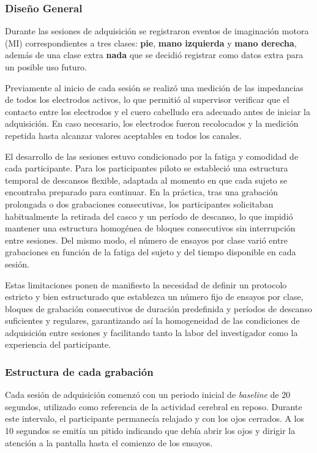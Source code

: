 \subsubsection{Diseño General}
Durante las sesiones de adquisición se registraron eventos de imaginación motora (MI) correspondientes a tres clases: \textbf{pie}, \textbf{mano izquierda} y \textbf{mano derecha}, además de una clase extra \textbf{nada} que se decidió registrar como datos extra para un posible uso futuro.

Previamente al inicio de cada sesión se realizó una medición de las impedancias de todos los electrodos activos, lo que permitió al supervisor verificar que el contacto entre los electrodos y el cuero cabelludo era adecuado antes de iniciar la adquisición. En caso necesario, los electrodos fueron recolocados y la medición repetida hasta alcanzar valores aceptables en todos los canales.

El desarrollo de las sesiones estuvo condicionado por la fatiga y comodidad de cada participante. Para los participantes piloto se estableció una estructura temporal de descansos flexible, adaptada al momento en que cada sujeto se encontraba preparado para continuar. En la práctica, tras una grabación prolongada o dos grabaciones consecutivas, los participantes solicitaban habitualmente la retirada del casco y un período de descanso, lo que impidió mantener una estructura homogénea de bloques consecutivos sin interrupción entre sesiones. Del mismo modo, el número de ensayos por clase varió entre grabaciones en función de la fatiga del sujeto y del tiempo disponible en cada sesión.

Estas limitaciones ponen de manifiesto la necesidad de definir un protocolo estricto y bien estructurado que establezca un número fijo de ensayos por clase, bloques de grabación consecutivos de duración predefinida y períodos de descanso suficientes y regulares, garantizando así la homogeneidad de las condiciones de adquisición entre sesiones y facilitando tanto la labor del investigador como la experiencia del participante.

\subsubsection{Estructura de cada grabación}
\label{subsec:estructuraGrabacion}
Cada sesión de adquisición comenzó con un periodo inicial de \textit{baseline} de 20 segundos, utilizado como referencia de la actividad cerebral en reposo. Durante este intervalo, el participante permanecía relajado y con los ojos cerrados. A los 10 segundos se emitía un pitido indicando que debía abrir los ojos y dirigir la atención a la pantalla hasta el comienzo de los ensayos.

